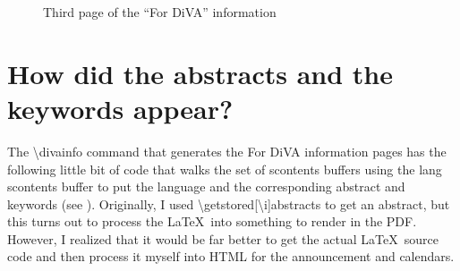 \begin{figure}[!ht]
  \begin{center}
  \end{center}
  \caption{Third page of the “For DiVA” information}
  \label{fig:sampleFOrDIVApage3}
\end{figure}
\clearpage
\FloatBarrier


\section{How did the abstracts and the keywords appear?}
\label{sec:scontentsHack}
The \textbackslash divainfo command that generates the For DiVA information pages has the following little bit of code that walks the set of scontents buffers using the lang scontents buffer to put the language and the corresponding abstract and keywords (see ). Originally, I used \textbackslash getstored[\textbackslash i]{abstracts} to get an abstract, but this turns out to process the \LaTeX~into something to render in the PDF. However, I realized that it would be far better to get the actual \LaTeX~source code and then process it myself into HTML for the announcement and calendars.

